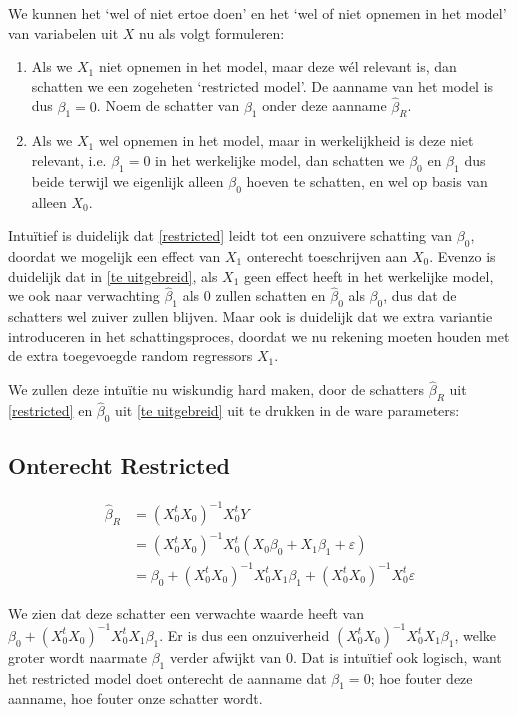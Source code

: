 \documentclass[a4paper]{report}
\begin{document}
  We kunnen het `wel of niet ertoe doen' en het `wel of niet opnemen in het model' van variabelen uit $X$ nu als volgt formuleren:
  
  \begin{enumerate}
  \item \label{restricted} Als we $X_1$ niet opnemen in het model, maar deze w\' el relevant is, dan schatten we een zogeheten `restricted model'. De aanname van het model is dus $\beta_1 = 0$. Noem de schatter van $\beta_1$ onder deze aanname $\hat{\beta}_R$.
  
  \item \label{te uitgebreid} Als we $X_1$ wel opnemen in het model, maar in werkelijkheid is deze niet relevant, i.e. $\beta_1 = 0$ in het werkelijke model, dan schatten we $\beta_0$ en $\beta_1$ dus beide terwijl we eigenlijk alleen $\beta_0$ hoeven te schatten, en wel op basis van alleen $X_0$.
  \end{enumerate}
  
  Intu\"itief is duidelijk dat \ref{restricted} leidt tot een onzuivere schatting van $\beta_0$, doordat we mogelijk een effect van $X_1$ onterecht toeschrijven aan $X_0$. Evenzo is duidelijk dat in \ref{te uitgebreid}, als $X_1$ geen effect heeft in het werkelijke model, we ook naar verwachting $\hat{\beta}_1$ als 0 zullen schatten en $\hat{\beta}_0$ als $\beta_0$, dus dat de schatters wel zuiver zullen blijven. Maar ook is duidelijk dat we extra variantie introduceren in het schattingsproces, doordat we nu rekening moeten houden met de extra toegevoegde random regressors $X_1$.
  
  We zullen deze intu\"itie nu wiskundig hard maken, door de schatters $\hat{\beta}_R$ uit \ref{restricted} en $\hat{\beta}_0$ uit \ref{te uitgebreid} uit te drukken in de ware parameters:
  
\subsection{Onterecht Restricted}
\label{onterecht restricted}
  \begin{align*}
  \hat{\beta}_R &= (X_0^tX_0)^{-1}X_0^tY \\ 
  &= (X_0^tX_0)^{-1}X_0^t(X_0\beta_0 + X_1\beta_1 + \varepsilon) \\
  &= \beta_0 + (X_0^tX_0)^{-1}X_0^tX_1\beta_1 + (X_0^tX_0)^{-1}X_0^t\varepsilon
  \end{align*}
  
  We zien dat deze schatter een verwachte waarde heeft van $\beta_0 + (X_0^tX_0)^{-1}X_0^tX_1\beta_1$. Er is dus een onzuiverheid $(X_0^tX_0)^{-1}X_0^tX_1\beta_1$, welke groter wordt naarmate $\beta_1$ verder afwijkt van $0$. Dat is intu\"itief ook logisch, want het restricted model doet onterecht de aanname dat $\beta_1=0$; hoe fouter deze aanname, hoe fouter onze schatter wordt.
  
\end{document}
